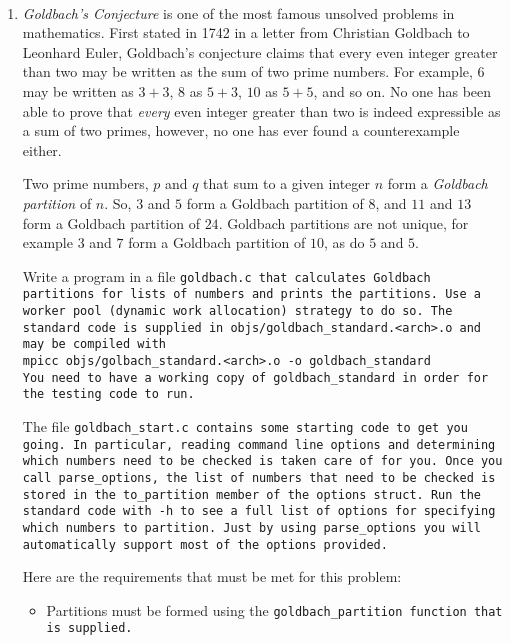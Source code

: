 \documentclass{article}
\begin{document}
\\
\begin{enumerate}

\item \textit{Goldbach's Conjecture} is one of the most famous
  unsolved problems in mathematics.  First stated in 1742 in a letter
  from Christian Goldbach to Leonhard Euler, Goldbach's conjecture
  claims that every even integer greater than two  may be
  written as the sum of two prime numbers.  For example, $6$ may be
  written as $3+3$, $8$ as $5+3$, $10$ as $5+5$, and so on. No one has
  been able to prove that \textit{every} even integer greater than two
  is indeed expressible as a sum of two primes, however, no one has
  ever found a counterexample either. 

  Two prime numbers, $p$ and $q$ that sum to a given integer $n$ form a \textit{Goldbach partition}
  of $n$.  So, $3$ and $5$ form a Goldbach partition of $8$, and $11$
  and $13$ form a Goldbach partition of $24$.  Goldbach partitions are
  not unique, for example $3$ and $7$ form a Goldbach partition of
  $10$, as do $5$ and $5$. 

  Write a program in a file \tt{goldbach.c} that calculates Goldbach partitions for lists of
  numbers and prints the partitions.  Use a worker pool (dynamic work
  allocation) strategy to do so.  The standard code is supplied in
  \tt{objs/goldbach\_standard.<arch>.o} and may be compiled with\\ 
  \tt{mpicc objs/golbach\_standard.<arch>.o -o goldbach\_standard}\\
  You need to have a working copy of \tt{goldbach\_standard} in order
  for the testing code to run. 

  The file \tt{goldbach\_start.c} contains some starting code to get
  you going.  In particular, reading command line options and
  determining which numbers need to be checked is taken care of for
  you.  Once you call \tt{parse\_options}, the list of numbers that
  need to be checked is stored in the \tt{to\_partition} member of the
  \tt{options} struct. Run the standard code with \tt{-h} to see a
  full list of options for specifying which numbers to partition.
  Just by using \tt{parse\_options} you will automatically support
  most of the options provided.  

  Here are the requirements that must be met for this problem:
  \begin{itemize}
  \item Partitions must be formed using the \tt{goldbach\_partition}
    function that is supplied. 


\end{itemize}
\end{enumerate}
\end{document}
